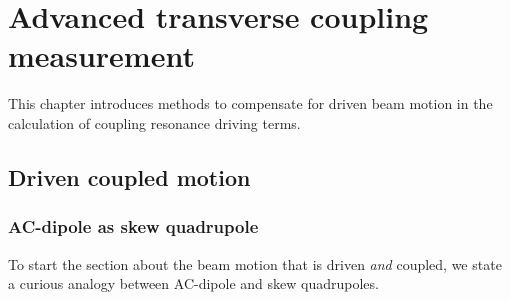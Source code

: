 \chapter{Advanced transverse coupling measurement}
\label{sec_coupling}

\begin{chapterinfo}
    This chapter introduces methods to compensate for driven beam motion in the calculation of
    coupling resonance driving terms. 
\end{chapterinfo}

\section{Driven coupled motion}

\subsection{AC-dipole as skew quadrupole}

To start the section about the beam motion that is driven \emph{and} coupled, we state a curious
analogy between AC-dipole and skew quadrupoles.

